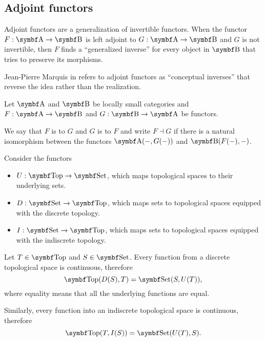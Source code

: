\subsection{Adjoint functors}\label{subsec:adjoint_functors}

\begin{remark}\label{def:adjoint_functors}
  Adjoint functors are a generalization of invertible functors. When the functor \( F: \Cat{A} \to \Bold B \) is left adjoint to \( G: \Cat{A} \to \Bold B \) and \( G \) is not invertible, then \( F \) finds a \enquote{generalized inverse} for every object in \( \Bold B \) that tries to preserve its morphisms.

  Jean-Pierre Marquis in \cite{StanfordPlato:category_theory} refers to adjoint functors as \enquote{conceptual inverses} that reverse the idea rather than the realization.
\end{remark}

\begin{definition}\label{def:adjoint_functor}\cite[exercise 4.1.32]{Leinster2014}
  Let \( \Cat{A} \) and \( \Bold B \) be locally small categories and \( F: \Cat{A} \to \Bold B \) and \( G: \Bold B \to \Cat{A} \) be functors.

  We say that \( F \) is  to \( G \) and \( G \) is  to \( F \) and write \( F \dashv G \) if there is a natural isomorphism between the functors \( \Cat{A}(-, G(-)) \) and \( \Cat{B}(F(-), -) \).
\end{definition}

\begin{example}\label{ex:top_adjoint_functor}\cite[example 2.1.5]{Leinster2014}
  Consider the functors
  \begin{itemize}
    \item \( U: \Cat{Top} \to \Cat{Set} \), which maps topological spaces to their underlying sets.
    \item \( D: \Cat{Set} \to \Cat{Top} \), which maps sets to topological spaces equipped with the discrete topology.
    \item \( I: \Cat{Set} \to \Cat{Top} \), which maps sets to topological spaces equipped with the indiscrete topology.
  \end{itemize}

  Let \( T \in \Cat{Top} \) and \( S \in \Cat{Set} \). Every function from a discrete topological space is continuous, therefore
  \begin{equation*}
    \Cat{Top}(D(S), T) = \Cat{Set}(S, U(T)),
  \end{equation*}
  where equality means that all the underlying functions are equal.

  Similarly, every function into an indiscrete topological space is continuous, therefore
  \begin{equation*}
    \Cat{Top}(T, I(S)) = \Cat{Set}(U(T), S).
  \end{equation*}
\end{example}

